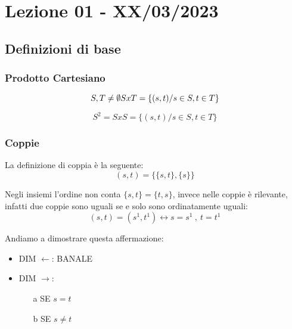 \section{Lezione 01 - XX/03/2023}

\subsection{Definizioni di base}

\subsubsection{Prodotto Cartesiano}

\begin{equation*}
S,T \neq \emptyset $$ $$ SxT = \{(s,t)/ s \in S, t \in T\}
\end{equation*}

\begin{equation*}
S^2 = SxS = \{(s,t)/ s \in S, t \in T\}
\end{equation*}


\subsubsection{Coppie}
La definizione di coppia è la seguente:
\begin{equation*}
(s,t) = \{\{s,t\}, \{s\}\}
\end{equation*}

Negli insiemi l'ordine non conta $ \{s,t\} = \{t,s\}$, invece nelle coppie è rilevante, infatti due coppie sono uguali se e solo  sono ordinatamente uguali:
$$ (s,t) = (s^1, t^1) \leftrightarrow s=s^1\:,\: t=t^1 $$

Andiamo a dimostrare questa affermazione: 

\begin{itemize}
\item DIM $\leftarrow$: BANALE
\item DIM $\rightarrow$:
	\begin{itemize}
		\item[a] SE $s=t$
		\item[b] SE $s \neq t$
	\end{itemize}
\end{itemize}




